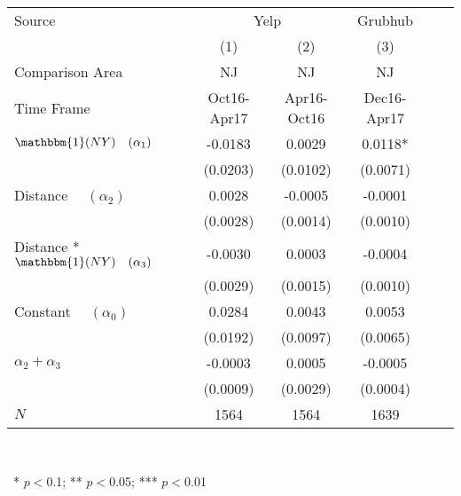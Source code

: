 \begin{center}
\begin{tabular}{lccccc}
\hline Source & \multicolumn{2}{c}{Yelp} & Grubhub &  & \\
 & (1) & (2) & (3) &  & \\
Comparison Area &   NJ    &   NJ    &   NJ    &  & \\
Time Frame & Oct16-Apr17 & Apr16-Oct16 & Dec16-Apr17 &  & \\
\hline  $ \mathbbm{1}(NY) \quad (\alpha_1) $  & -0.0183 & 0.0029 & 0.0118* &  & \\
  & (0.0203) & (0.0102) & (0.0071) &  & \\
 Distance $\quad (\alpha_2) $  & 0.0028 & -0.0005 & -0.0001 &  & \\
  & (0.0028) & (0.0014) & (0.0010) &  & \\
 Distance * $ \mathbbm{1}(NY) \quad (\alpha_3) $  & -0.0030 & 0.0003 & -0.0004 &  & \\
  & (0.0029) & (0.0015) & (0.0010) &  & \\
 Constant $\quad (\alpha_0) $  & 0.0284 & 0.0043 & 0.0053 &  & \\
  & (0.0192) & (0.0097) & (0.0065) &  & \\
\hline  $ \alpha_2 + \alpha_3 $  & -0.0003 & 0.0005 & -0.0005 &  & \\
  & (0.0009) & (0.0029) & (0.0004) &  & \\
\hline  $ N $  & 1564 & 1564 & 1639 &  & \\
\hline\end{tabular}\\
\begin{tiny}\ * $p<0$.1; ** $p<0$.05; *** $p<0$.01\end{tiny}\\
\end{center}

